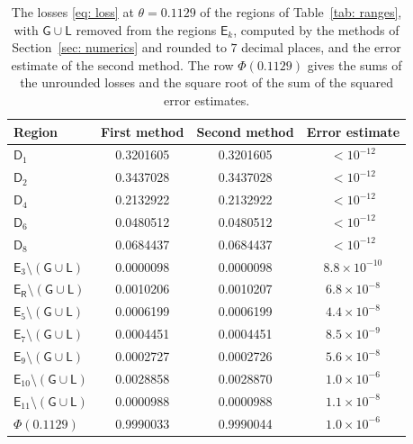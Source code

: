 \documentclass{article}
\numberwithin{equation}{section}
\begin{document}
\begin{table}[ht]
\centering
\begin{tabular}{lccc}
\toprule
Region & First method & Second method & Error estimate \\
\midrule
$\mathsf{D}_1$ & 0.3201605 & 0.3201605 & $< 10^{-12}$ \\
$\mathsf{D}_2$ & 0.3437028 & 0.3437028 & $< 10^{-12}$ \\
$\mathsf{D}_4$ & 0.2132922 & 0.2132922 & $< 10^{-12}$ \\
$\mathsf{D}_6$ & 0.0480512 & 0.0480512 & $< 10^{-12}$ \\
$\mathsf{D}_8$ & 0.0684437 & 0.0684437 & $< 10^{-12}$ \\
$\mathsf{E}_3 \setminus (\mathsf{G} \cup \mathsf{L})$ & 0.0000098 & 0.0000098 & $8.8 \times 10^{-10}$ \\
$\mathsf{E}_{\mathsf{R}} \setminus (\mathsf{G} \cup \mathsf{L})$ & 0.0010206 & 0.0010207 & $6.8 \times 10^{-8}$ \\
$\mathsf{E}_5 \setminus (\mathsf{G} \cup \mathsf{L})$ & 0.0006199 & 0.0006199 & $4.4 \times 10^{-8}$ \\
$\mathsf{E}_7 \setminus (\mathsf{G} \cup \mathsf{L})$ & 0.0004451 & 0.0004451 & $8.5 \times 10^{-9}$ \\
$\mathsf{E}_9 \setminus (\mathsf{G} \cup \mathsf{L})$ & 0.0002727 & 0.0002726 & $5.6 \times 10^{-8}$ \\
$\mathsf{E}_{10} \setminus (\mathsf{G} \cup \mathsf{L})$ & 0.0028858 & 0.0028870 & $1.0 \times 10^{-6}$ \\
$\mathsf{E}_{11} \setminus (\mathsf{G} \cup \mathsf{L})$ & 0.0000988 & 0.0000988 & $1.1 \times 10^{-8}$ \\
\midrule
$\Phi(0.1129)$ & 0.9990033 & 0.9990044 & $1.0 \times 10^{-6}$ \\
\bottomrule
\end{tabular}
\caption{The losses \eqref{eq: loss} at $\theta = 0.1129$ of the regions of Table~\ref{tab: ranges}, with $\mathsf{G} \cup \mathsf{L}$ removed from the regions $\mathsf{E}_k$, computed by the methods of Section~\ref{sec: numerics} and rounded to $7$ decimal places, and the error estimate of the second method. The row $\Phi(0.1129)$ gives the sums of the unrounded losses and the square root of the sum of the squared error estimates.}
\label{tab: losses}
\end{table}
\end{document}
